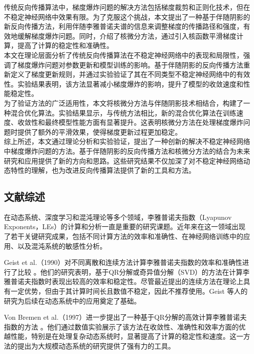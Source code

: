 \documentclass[12pt,a4paper]{amsart}
\begin{document}
传统反向传播算法中，梯度爆炸问题的解决方法包括梯度裁剪和正则化技术，但在不稳定神经网络中效果有限。为了克服这个挑战，本文提出了一种基于伴随阴影的新反向传播方法，利用伴随李雅普诺夫谱的信息来调整梯度的传播路径和强度，有效地缓解梯度爆炸问题。同时，介绍了核微分方法，通过引入核函数平滑梯度计算，提高了计算的稳定性和准确性。\\

本文在理论层面分析了传统反向传播算法在不稳定神经网络中的表现和局限性，强调了梯度爆炸问题对参数更新和模型训练的影响。基于伴随阴影的反向传播方法重新定义了梯度更新规则，并通过实验验证了其在不同类型不稳定神经网络中的有效性。实验结果表明，该方法显著减小梯度爆炸的影响，提升了模型的收敛速度和性能稳定性。\\

为了验证方法的广泛适用性，本文将核微分方法与伴随阴影技术相结合，构建了一种混合优化算法。实验结果显示，与传统方法相比，新的混合优化算法在训练速度、收敛性和最终模型性能方面有显著提升。这表明核微分方法在处理梯度爆炸问题时提供了额外的平滑效果，使得梯度更新过程更加稳定。\\

综上所述，本文通过理论分析和实验验证，提出了一种创新的解决不稳定神经网络中梯度爆炸问题的方法。基于伴随阴影的反向传播方法和核微分方法的结合为未来研究和应用提供了新的方向和思路。这些研究结果不仅加深了对不稳定神经网络动态特性的理解，也为改进反向传播算法提供了新的工具和方法。\\

\subsection{文献综述}

在动态系统、深度学习和混沌理论等多个领域，李雅普诺夫指数（Lyapunov Exponents，LEs）的计算和分析一直是重要的研究课题。近年来在这一领域出现了若干关键研究成果，包括不同计算方法的效率和准确性、在神经网络训练中的应用、以及混沌系统的敏感性分析。

Geist et al.（1990）对不同离散和连续方法计算李雅普诺夫指数的效率和准确性进行了比较 \cite{Geist1990}。他们的研究表明，基于QR分解或奇异值分解（SVD）的方法在计算李雅普诺夫指数时表现出较高的效率和稳定性。尽管最近提出的连续方法在理论上具有一定优势，但由于其计算时间长且数值不稳定，因此不推荐使用。Geist 等人的研究为后续在动态系统中的应用奠定了基础。

Von Bremen et al.（1997）进一步提出了一种基于QR分解的高效计算李雅普诺夫指数的方法 \cite{VONBREMEN19971}。他们通过数值实验展示了该方法在收敛性、准确性和效率方面的优越性能，特别是在处理复杂动态系统时，显著提高了计算的稳定性和速度。这一方法的提出为大规模动态系统的研究提供了强有力的工具。
\end{document}
